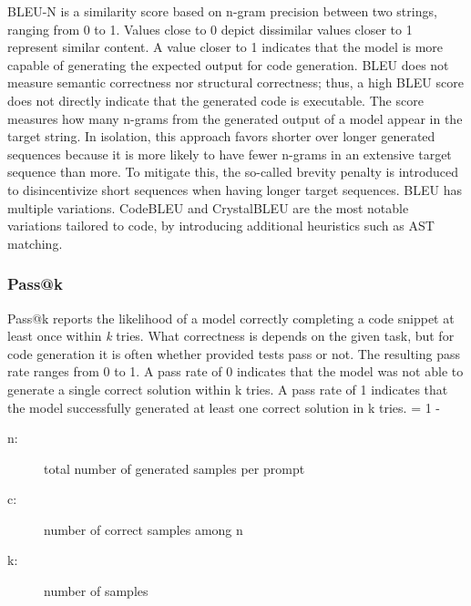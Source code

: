\documentclass[11pt]{article}
\begin{document}
BLEU-N \cite{DBLP:conf/acl/PapineniRWZ02} is a similarity score based on n-gram precision between two strings, ranging from 0 to 1.
Values close to 0 depict dissimilar values closer to 1 represent similar content.
A value closer to 1 indicates that the model is more capable of generating the expected output for code generation.
BLEU does not measure semantic correctness nor structural correctness; thus, a high BLEU score does not directly indicate that the generated code is executable.
The score measures how many n-grams from the generated output of a model appear in the target string.
In isolation, this approach favors shorter over longer generated sequences because it is more likely to have fewer n-grams in an extensive target sequence than more.
To mitigate this, the so-called brevity penalty is introduced to disincentivize short sequences when having longer target sequences.
BLEU has multiple variations.
CodeBLEU \cite{DBLP:journals/corr/abs-2009-10297} and CrystalBLEU \cite{DBLP:conf/kbse/EghbaliP22} are the most notable variations tailored to code, by introducing additional heuristics such as AST matching.

\subsubsection{Pass@k}
Pass@k reports the likelihood of a model correctly completing a code snippet at least once within \emph{k} tries.
What correctness is depends on the given task, but for code generation it is often whether provided tests pass or not.
The resulting pass rate ranges from 0 to 1.
A pass rate of 0 indicates that the model was not able to generate a single correct solution within k tries.
A pass rate of 1 indicates that the model successfully generated at least one correct solution in k tries.
 = 1 - 
\begin{description}
    \item[n:] total number of generated samples per prompt
    \item[c:] number of correct samples among  n
    \item[k:] number of samples
\end{description}
\end{document}
